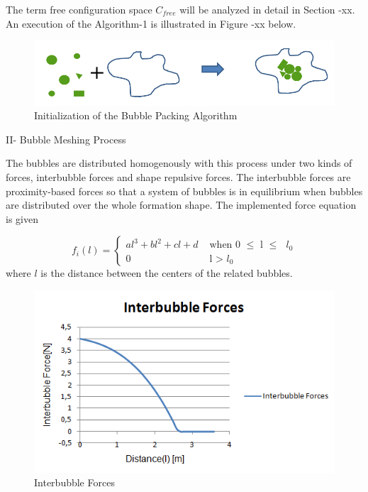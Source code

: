 \documentclass[twoside]{article}
\begin{document}
		The term free configuration space $C_{free}$ will be analyzed in detail in Section -xx. An execution of the Algorithm-1 is illustrated in Figure -xx below.
		
				\begin{figure}[H]
					\caption{Initialization of the Bubble Packing Algorithm}
					\centering
					\includegraphics[scale = 0.50]{bubble_packing}
				\end{figure}
				

		
		II- Bubble Meshing Process 
		
		The bubbles are distributed homogenously with this process under two kinds of forces, interbubble forces and shape repulsive forces. The interbubble forces are proximity-based forces so that a system of bubbles is in equilibrium when bubbles are distributed over the whole formation shape. The implemented force equation is given
		
		\begin{equation}
		f_i(l) = \left\{ \begin{array}{rl}
		al^3 + bl^2 + cl + d &\mbox{ when 0 $\leq$ l $\leq$ $l_0$} \\
		0                               &\mbox{ l > $l_0$}
		\end{array} \right.
		\end{equation}
	where $l$ is the distance between the centers of the related bubbles. 
		\begin{figure}[H]
			\caption{Interbubble Forces}
			\centering
			\includegraphics[scale = 0.70]{interbubble_forces}
		\end{figure}
		
\end{document}
